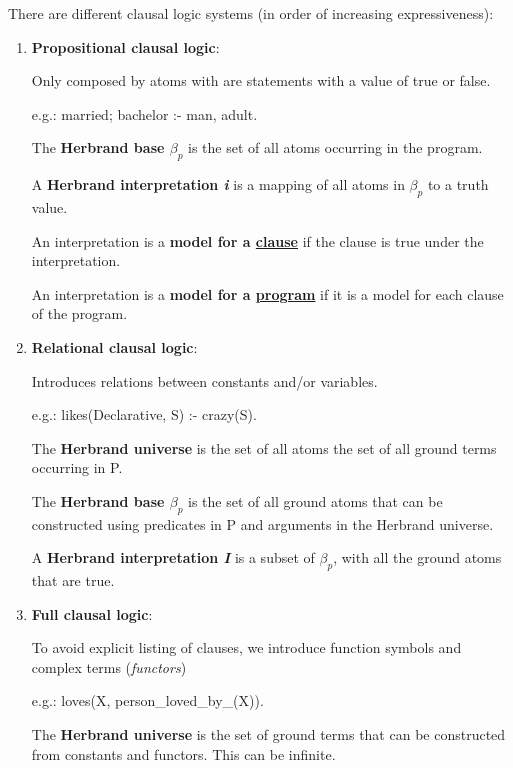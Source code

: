 \documentclass[12pt, oneside]{report}
\numberwithin{definition}{chapter}
\numberwithin{theorem}{chapter}
\numberwithin{lemma}{chapter}
\numberwithin{Rule}{chapter}
\numberwithin{equation}{chapter}
\begin{document}
There are different clausal logic systems (in order of increasing expressiveness):
\begin{enumerate}
\item \textbf{Propositional clausal logic}:

Only composed by atoms with are statements with a value of true or false.

e.g.: married; bachelor :- man, adult.

The \textbf{Herbrand base $\beta_p$} is the set of all atoms occurring in the program.

A \textbf{Herbrand interpretation \textit{i}} is a mapping of all atoms in $\beta_p$ to a truth value.

An interpretation is a \textbf{model for a \underline{clause}} if the clause is true under the interpretation.

An interpretation is a \textbf{model for a \underline{program}} if it is a model for each clause of the program.



\item \textbf{Relational clausal logic}:

Introduces relations between constants and/or variables.

e.g.: likes(Declarative, S) :- crazy(S).

The \textbf{Herbrand universe} is the set of all atoms the set of all ground terms occurring in P.

The \textbf{Herbrand base $\beta_p$} is the set of all ground atoms that can be constructed using predicates in P and arguments in the Herbrand universe.

A \textbf{Herbrand interpretation \textit{I}} is a subset of $\beta_p$, with all the ground atoms that are true.




\item \textbf{Full clausal logic}:

To avoid explicit listing of clauses, we introduce function symbols and complex terms (\textit{functors}) 

e.g.: loves(X, person\_loved\_by\_(X)).


The \textbf{Herbrand universe} is the set of ground terms that can be constructed from constants and functors. This can be infinite.


\end{enumerate}
\end{document}
